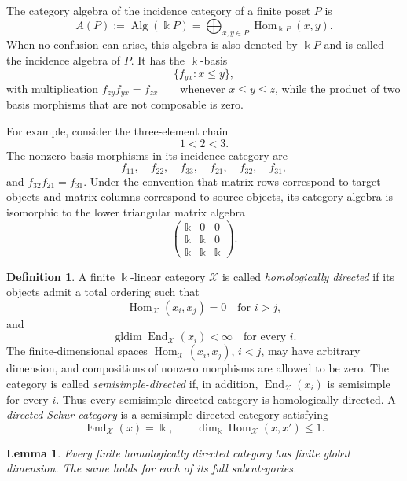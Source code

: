 \documentclass[12pt,a4paper,english,reqno]{amsart}
\theoremstyle{plain}
\newtheorem{lemma}[theorem]{Lemma}
\theoremstyle{definition}
\newtheorem{definition}[theorem]{Definition}
\newcommand{\kk}{\Bbbk}
\newcommand{\Hom}{\operatorname{Hom}}
\newcommand{\End}{\operatorname{End}}
\newcommand{\gldim}{\operatorname{gldim}}
\newcommand{\X}{\mathcal X}
\begin{document}
The category algebra of the incidence category of a finite poset $P$ is
\[
A(P)
:=
\operatorname{Alg}(\kk P)
=
\bigoplus_{x,y\in P}
\operatorname{Hom}_{\kk P}(x,y).
\]
When no confusion can arise, this algebra is also denoted by $\kk P$
and is called the incidence algebra of $P$. It has the $\kk$-basis
\[
\{f_{yx}:x\leq y\},
\]
with multiplication $f_{zy}f_{yx}=f_{zx}\qquad\text{whenever }x\leq y\leq z$,
while the product of two basis morphisms that are not composable is zero.

For example, consider the three-element chain
\[
1<2<3.
\]
The nonzero basis morphisms in its incidence category are
\[
f_{11},\quad f_{22},\quad f_{33},\quad
f_{21},\quad f_{32},\quad f_{31},
\]
and $f_{32}f_{21}=f_{31}$.
Under the convention that matrix rows correspond to target objects and
matrix columns correspond to source objects, its category algebra is
isomorphic to the lower triangular matrix algebra
\[
\begin{pmatrix}
\Bbbk & 0     & 0\\
\Bbbk & \Bbbk & 0\\
\Bbbk & \Bbbk & \Bbbk
\end{pmatrix}.
\]


\begin{definition}
A finite $\kk$-linear category $\X$ is called
\emph{homologically directed} if its objects admit a total ordering such that
\[
 \Hom_{\X}(x_i,x_j)=0\quad\text{for }i>j,
\]
and
\[
 \gldim\End_{\X}(x_i)<\infty\quad\text{for every }i.
\]
The finite-dimensional spaces
$\Hom_{\X}(x_i,x_j)$, $i<j$, may have arbitrary dimension, and
compositions of nonzero morphisms are allowed to be zero.  The category is
called \emph{semisimple-directed} if, in addition,
$\End_{\X}(x_i)$ is semisimple for every $i$.  Thus every
semisimple-directed category is homologically directed.  A
\emph{directed Schur category} is a semisimple-directed category satisfying
\[
 \End_{\X}(x)=\kk,
 \qquad
 \dim_{\kk}\Hom_{\X}(x,x')\leq1.
\]
\end{definition}

\begin{lemma}
\label{lem:homologically-directed-global-dimension}
Every finite homologically directed category has finite global dimension.  The
same holds for each of its full subcategories.
\end{lemma}
\end{document}
